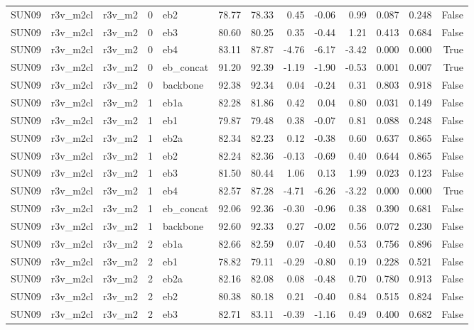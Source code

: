 \begin{table}
\begin{tabular}{lllrlrrrrrllr}
SUN09 & r3v\_m2cl & r3v\_m2 & 0 & eb2 & 78.77 & 78.33 & 0.45 & -0.06 & 0.99 & 0.087 & 0.248 & False \\
SUN09 & r3v\_m2cl & r3v\_m2 & 0 & eb3 & 80.60 & 80.25 & 0.35 & -0.44 & 1.21 & 0.413 & 0.684 & False \\
SUN09 & r3v\_m2cl & r3v\_m2 & 0 & eb4 & 83.11 & 87.87 & -4.76 & -6.17 & -3.42 & 0.000 & 0.000 & True \\
SUN09 & r3v\_m2cl & r3v\_m2 & 0 & eb\_concat & 91.20 & 92.39 & -1.19 & -1.90 & -0.53 & 0.001 & 0.007 & True \\
SUN09 & r3v\_m2cl & r3v\_m2 & 0 & backbone & 92.38 & 92.34 & 0.04 & -0.24 & 0.31 & 0.803 & 0.918 & False \\
SUN09 & r3v\_m2cl & r3v\_m2 & 1 & eb1a & 82.28 & 81.86 & 0.42 & 0.04 & 0.80 & 0.031 & 0.149 & False \\
SUN09 & r3v\_m2cl & r3v\_m2 & 1 & eb1 & 79.87 & 79.48 & 0.38 & -0.07 & 0.81 & 0.088 & 0.248 & False \\
SUN09 & r3v\_m2cl & r3v\_m2 & 1 & eb2a & 82.34 & 82.23 & 0.12 & -0.38 & 0.60 & 0.637 & 0.865 & False \\
SUN09 & r3v\_m2cl & r3v\_m2 & 1 & eb2 & 82.24 & 82.36 & -0.13 & -0.69 & 0.40 & 0.644 & 0.865 & False \\
SUN09 & r3v\_m2cl & r3v\_m2 & 1 & eb3 & 81.50 & 80.44 & 1.06 & 0.13 & 1.99 & 0.023 & 0.123 & False \\
SUN09 & r3v\_m2cl & r3v\_m2 & 1 & eb4 & 82.57 & 87.28 & -4.71 & -6.26 & -3.22 & 0.000 & 0.000 & True \\
SUN09 & r3v\_m2cl & r3v\_m2 & 1 & eb\_concat & 92.06 & 92.36 & -0.30 & -0.96 & 0.38 & 0.390 & 0.681 & False \\
SUN09 & r3v\_m2cl & r3v\_m2 & 1 & backbone & 92.60 & 92.33 & 0.27 & -0.02 & 0.56 & 0.072 & 0.230 & False \\
SUN09 & r3v\_m2cl & r3v\_m2 & 2 & eb1a & 82.66 & 82.59 & 0.07 & -0.40 & 0.53 & 0.756 & 0.896 & False \\
SUN09 & r3v\_m2cl & r3v\_m2 & 2 & eb1 & 78.82 & 79.11 & -0.29 & -0.80 & 0.19 & 0.228 & 0.521 & False \\
SUN09 & r3v\_m2cl & r3v\_m2 & 2 & eb2a & 82.16 & 82.08 & 0.08 & -0.48 & 0.70 & 0.780 & 0.913 & False \\
SUN09 & r3v\_m2cl & r3v\_m2 & 2 & eb2 & 80.38 & 80.18 & 0.21 & -0.40 & 0.84 & 0.515 & 0.824 & False \\
SUN09 & r3v\_m2cl & r3v\_m2 & 2 & eb3 & 82.71 & 83.11 & -0.39 & -1.16 & 0.49 & 0.400 & 0.682 & False \\

\end{tabular}
\end{table}
